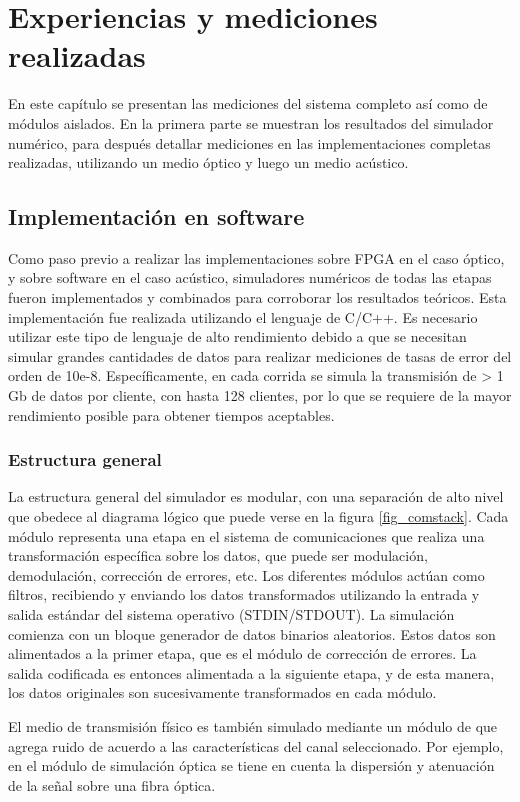 \chapter{Experiencias y mediciones realizadas}
\label{simulations}
En este capítulo se presentan las mediciones del sistema completo así como de módulos aislados. 
En la primera parte se muestran los resultados del simulador numérico, para después detallar mediciones en las implementaciones completas realizadas, utilizando un medio óptico y luego un medio acústico.
\section{Implementación en software}
Como paso previo a realizar las implementaciones sobre FPGA en el caso óptico, y sobre software en el caso acústico, simuladores numéricos de todas las etapas fueron implementados y combinados para corroborar los resultados teóricos. Esta implementación fue realizada utilizando el lenguaje de C/C++. Es necesario utilizar este tipo de lenguaje de alto rendimiento debido a que se necesitan simular grandes cantidades de datos para realizar mediciones de tasas de error del orden de 10e-8. Específicamente, en cada corrida se simula la transmisión de > 1 Gb de datos por cliente, con hasta 128 clientes, por lo que se requiere de la mayor rendimiento posible para obtener tiempos aceptables.

\subsection{Estructura general}

La estructura general del simulador es modular, con una separación de alto nivel que obedece al diagrama lógico que puede verse en la figura \ref{fig_comstack}.
Cada módulo representa una etapa en el sistema de comunicaciones que realiza una transformación específica sobre los datos, que puede ser modulación, demodulación, corrección de errores, etc. Los diferentes módulos actúan como filtros, recibiendo y enviando los datos transformados utilizando la entrada y salida estándar del sistema operativo (STDIN/STDOUT). La simulación comienza con un bloque generador de datos binarios aleatorios. Estos datos son alimentados a la primer etapa, que es el módulo de corrección de errores. La salida codificada es entonces alimentada a la siguiente etapa, y de esta manera, los datos originales son sucesivamente transformados en cada módulo.

El medio de transmisión físico es también simulado mediante un módulo de que agrega ruido de acuerdo a las características del canal seleccionado. Por ejemplo, en el módulo de simulación óptica se tiene en cuenta la dispersión y atenuación de la señal sobre una fibra óptica.

